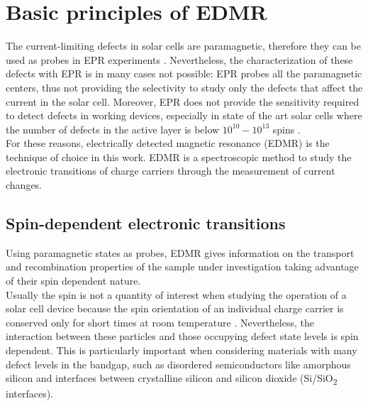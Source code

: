 \documentclass[a4paper]{book}
\newcommand{\tsub}{\textsubscript}
\begin{document}
	\section{Basic principles of EDMR}
	The current-limiting defects in solar cells are paramagnetic, therefore they can be used as probes in EPR experiments \cite{lenahanWhatCanElectron1998}. Nevertheless, the characterization of these defects with EPR is in many cases not possible: EPR probes all the paramagnetic centers, thus not providing the selectivity to study only the defects that affect the current in the solar cell. Moreover, EPR does not provide the sensitivity required to detect defects in working devices, especially in state of the art solar cells where the number of defects in the active layer is below $10^{10} - 10^{13}$ spins \cite{schneggPulsedElectricallyDetected2012}.\\
	For these reasons, electrically detected magnetic resonance (EDMR) is the technique of choice in this work. EDMR is a spectroscopic method to study the electronic transitions of charge carriers through the measurement of current changes.
	
	\subsection{Spin-dependent electronic transitions}
	\label{sec:2_spin-dependent_electronic_processes}
	Using paramagnetic states as probes, EDMR gives information on the transport and recombination properties of the sample under investigation taking advantage of their spin dependent nature.\\
	Usually the spin is not a quantity of interest when studying the operation of a solar cell device because the spin orientation of an individual charge carrier is conserved only for short times at room temperature \cite{behrendsSpindependentTransportRecombination2009}. Nevertheless, the interaction between these particles and those occupying defect state levels is spin dependent.
	This is particularly important when considering materials with many defect levels in the bandgap, such as disordered semiconductors like amorphous silicon and interfaces between crystalline silicon and silicon dioxide (Si/SiO\tsub 2 interfaces).
	
\end{document}
